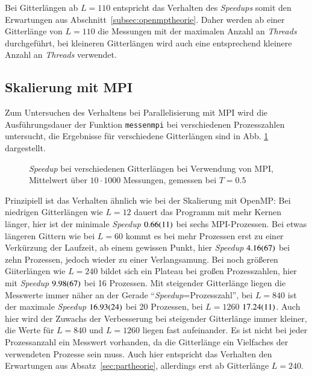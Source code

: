 	Bei Gitterlängen ab $L=110$ entspricht das Verhalten des \textit{Speedups} somit den Erwartungen aus Abschnitt~\ref{subsec:openmptheorie}. Daher werden ab einer Gitterlänge von $L=110$ die Messungen mit der maximalen Anzahl an \textit{Threads} durchgeführt, bei kleineren Gitterlängen wird auch eine entsprechend kleinere Anzahl an \textit{Threads} verwendet. 
	
	\subsection{Skalierung mit MPI}
	\label{subsec:ergebnissempi}
	
	Zum Untersuchen des Verhaltens bei Parallelisierung mit MPI wird die Ausführungsdauer der Funktion \texttt{messenmpi} bei verschiedenen Prozesszahlen untersucht, die Ergebnisse für verschiedene Gitterlängen sind in Abb. \ref{fig:skalierunglaengempi} dargestellt.
	
		\begin{figure}[htbp]
			
			\caption[\textit{Speedup} bei verschiedenen Gitterlängen bei Verwendung von MPI]{\textit{Speedup} bei verschiedenen Gitterlängen bei Verwendung von MPI, Mittelwert über $10 \cdot 1000$ Messungen, gemessen bei $T=\num{0,5}$}
			\label{fig:skalierunglaengempi}
		\end{figure}
		
	Prinzipiell ist das Verhalten ähnlich wie bei der Skalierung mit OpenMP: Bei niedrigen Gitterlängen wie $L=12$ dauert das Programm mit mehr Kernen länger, hier ist der minimale \textit{Speedup} $\num{0,66\pm0,11}$ bei sechs MPI-Prozessen. Bei etwas längeren Gittern wie bei $L=60$ kommt es bei mehr Prozessen erst zu einer Verkürzung der Laufzeit, ab einem gewissen Punkt, hier \textit{Speedup} $\num{4,16\pm0,67}$ bei zehn Prozessen, jedoch wieder zu einer Verlangsamung. Bei noch größeren Giiterlängen wie $L=240$ bildet sich ein Plateau bei großen Prozesszahlen, hier mit \textit{Speedup} $\num{9,98\pm 0,67}$ bei 16 Prozessen. Mit steigender Gitterlänge liegen die Messwerte immer näher an der Gerade \enquote{\textit{Speedup}=Prozesszahl}, bei $L=840$ ist der maximale \textit{Speedup} $\num{16,93\pm0,24}$ bei 20 Prozessen, bei $L=1260$ $\num{17,24\pm0,11}$. Auch hier wird der Zuwachs der Verbesserung bei steigender Gitterlänge immer kleiner, die Werte für $L=840$ und $L=1260$ liegen fast aufeinander. Es ist nicht bei jeder Prozessanzahl ein Messwert vorhanden, da die Gitterlänge ein Vielfaches der verwendeten Prozesse sein muss.
	Auch hier entspricht das Verhalten den Erwartungen aus Absatz~\ref{sec:partheorie}, allerdings erst ab Gitterlänge $L=240$.

